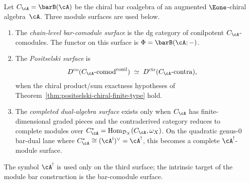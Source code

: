 \begin{definition}
\label{def:module-comparison-surfaces}
Let $C_\cA=\barB(\cA)$ be the chiral bar coalgebra of an augmented
$\Eone$-chiral algebra~$\cA$. Three module surfaces are used below.
\begin{enumerate}[label=\textup{(\roman*)}]
\item The \emph{chain-level bar-comodule surface} is the dg category
 of conilpotent $C_\cA$-comodules. The functor on this surface is
 $\Phi=\barB(\cA;-)$.
\item The \emph{Positselski surface} is
 \[
 D^{\mathrm{co}}(C_\cA\text{-}\mathrm{comod}^{\mathrm{conil}})
 \;\simeq\;
 D^{\mathrm{ctr}}(C_\cA\text{-}\mathrm{contra}),
 \]
 when the chiral product/sum exactness hypotheses of
 Theorem~\textup{\ref{thm:positselski-chiral-finite-type}} hold.
\item The \emph{completed dual-algebra surface} exists only when
 $C_\cA$ has finite-dimensional graded pieces and the contraderived
 category reduces to complete modules over
 $C_\cA^*=\operatorname{Hom}_{\mathcal D_X}(C_\cA,\omega_X)$.
 On the quadratic genus-$0$ bar-dual lane where
 $C_\cA^*\cong(\cA^{\mathrm i})^\vee=\cA^!$, this becomes a
 complete $\cA^!$-module surface.
\end{enumerate}
The symbol $\cA^!$ is used only on the third surface; the intrinsic
target of the module bar construction is the bar-comodule surface.
\end{definition}

